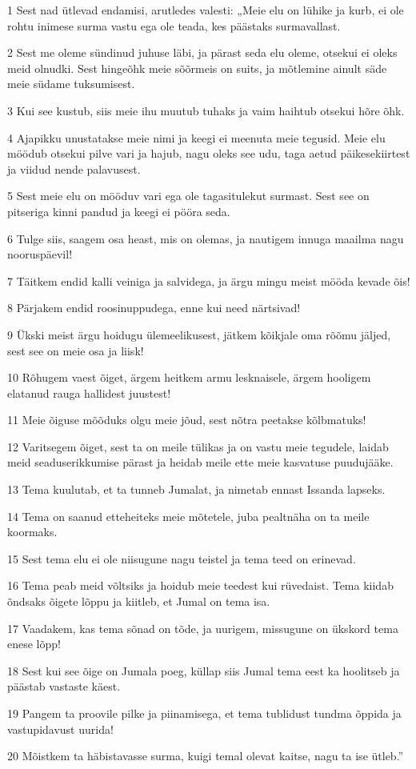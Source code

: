 \par 1 Sest nad ütlevad endamisi, arutledes valesti: „Meie elu on lühike ja kurb, ei ole rohtu inimese surma vastu ega ole teada, kes päästaks surmavallast.
\par 2 Sest me oleme sündinud juhuse läbi, ja pärast seda elu oleme, otsekui ei oleks meid olnudki. Sest hingeõhk meie sõõrmeis on suits, ja mõtlemine ainult säde meie südame tuksumisest.
\par 3 Kui see kustub, siis meie ihu muutub tuhaks ja vaim haihtub otsekui hõre õhk.
\par 4 Ajapikku unustatakse meie nimi ja keegi ei meenuta meie tegusid. Meie elu möödub otsekui pilve vari ja hajub, nagu oleks see udu, taga aetud päikesekiirtest ja viidud nende palavusest.
\par 5 Sest meie elu on mööduv vari ega ole tagasitulekut surmast. Sest see on pitseriga kinni pandud ja keegi ei pööra seda.
\par 6 Tulge siis, saagem osa heast, mis on olemas, ja nautigem innuga maailma nagu nooruspäevil!
\par 7 Täitkem endid kalli veiniga ja salvidega, ja ärgu mingu meist mööda kevade õis!
\par 8 Pärjakem endid roosinuppudega, enne kui need närtsivad!
\par 9 Ükski meist ärgu hoidugu ülemeelikusest, jätkem kõikjale oma rõõmu jäljed, sest see on meie osa ja liisk!
\par 10 Rõhugem vaest õiget, ärgem heitkem armu lesknaisele, ärgem hooligem elatanud rauga hallidest juustest!
\par 11 Meie õiguse mõõduks olgu meie jõud, sest nõtra peetakse kõlbmatuks!
\par 12 Varitsegem õiget, sest ta on meile tülikas ja on vastu meie tegudele, laidab meid seaduserikkumise pärast ja heidab meile ette meie kasvatuse puudujääke.
\par 13 Tema kuulutab, et ta tunneb Jumalat, ja nimetab ennast Issanda lapseks.
\par 14 Tema on saanud etteheiteks meie mõtetele, juba pealtnäha on ta meile koormaks.
\par 15 Sest tema elu ei ole niisugune nagu teistel ja tema teed on erinevad.
\par 16 Tema peab meid võltsiks ja hoidub meie teedest kui rüvedaist. Tema kiidab õndsaks õigete lõppu ja kiitleb, et Jumal on tema isa.
\par 17 Vaadakem, kas tema sõnad on tõde, ja uurigem, missugune on ükskord tema enese lõpp!
\par 18 Sest kui see õige on Jumala poeg, küllap siis Jumal tema eest ka hoolitseb ja päästab vastaste käest.
\par 19 Pangem ta proovile pilke ja piinamisega, et tema tublidust tundma õppida ja vastupidavust uurida!
\par 20 Mõistkem ta häbistavasse surma, kuigi temal olevat kaitse, nagu ta ise ütleb.” 

